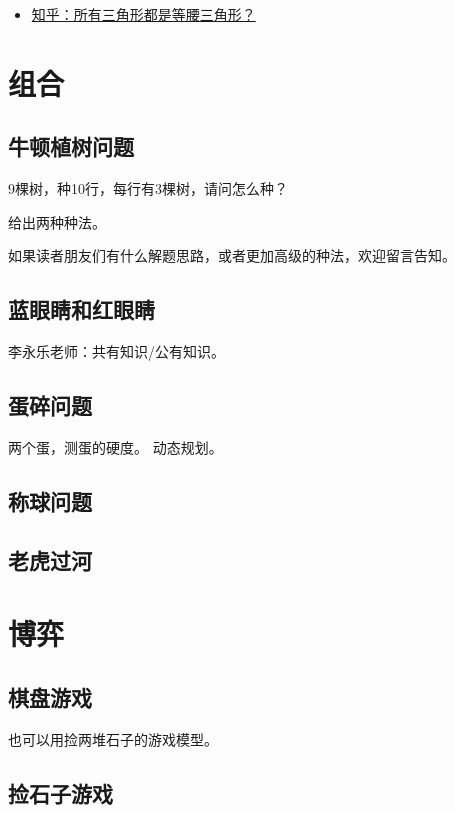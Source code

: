 \documentclass[12pt, letterpaper]{ctexrep}
\begin{document}
\begin{itemize}
\item{ \href{https://www.zhihu.com/question/34781603/answer/59948789}{知乎：所有三角形都是等腰三角形？} }
\end{itemize}





\chapter{组合}


\section{牛顿植树问题}
9棵树，种10行，每行有3棵树，请问怎么种？

给出两种种法。

如果读者朋友们有什么解题思路，或者更加高级的种法，欢迎留言告知。


\section{蓝眼睛和红眼睛}
李永乐老师：共有知识/公有知识。


\section{蛋碎问题}
两个蛋，测蛋的硬度。
动态规划。


\section{称球问题}


\section{老虎过河}




\chapter{博弈}


\section{棋盘游戏}
也可以用捡两堆石子的游戏模型。


\section{捡石子游戏}
\end{document}
